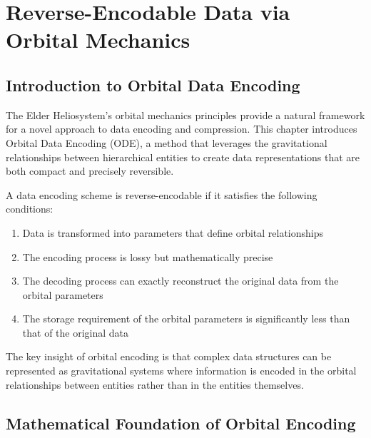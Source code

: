 \chapter{Reverse-Encodable Data via Orbital Mechanics}

\section{Introduction to Orbital Data Encoding}

The Elder Heliosystem's orbital mechanics principles provide a natural framework for a novel approach to data encoding and compression. This chapter introduces Orbital Data Encoding (ODE), a method that leverages the gravitational relationships between hierarchical entities to create data representations that are both compact and precisely reversible.

\begin{definition}
A data encoding scheme is reverse-encodable if it satisfies the following conditions:
\begin{enumerate}
    \item Data is transformed into parameters that define orbital relationships
    \item The encoding process is lossy but mathematically precise
    \item The decoding process can exactly reconstruct the original data from the orbital parameters
    \item The storage requirement of the orbital parameters is significantly less than that of the original data
\end{enumerate}
\end{definition}

The key insight of orbital encoding is that complex data structures can be represented as gravitational systems where information is encoded in the orbital relationships between entities rather than in the entities themselves.

\section{Mathematical Foundation of Orbital Encoding}

